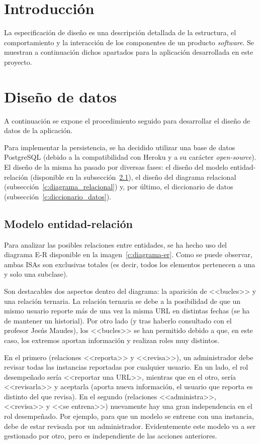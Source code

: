 
\section{Introducción}

La especificación de diseño es una descripción detallada de la estructura, el comportamiento y la interacción de los componentes de un producto \textit{software}. Se muestran a continuación dichos apartados para la aplicación desarrollada en este proyecto.

\section{Diseño de datos}
\label{s:diseno-datos}
A continuación se expone el procedimiento seguido para desarrollar el diseño de datos de la aplicación.

Para implementar la persistencia, se ha decidido utilizar una base de datos PostgreSQL (debido a la compatibilidad con Heroku y a su carácter \textit{open-source}). El diseño de la misma ha pasado por diversas fases: el diseño del modelo entidad-relación (disponible en la subsección~\ref{c:diagrama_entidad_relacion}), el diseño del diagrama relacional (subsección~\ref{c:diagrama_relacional}) y, por último, el diccionario de datos (subsección~\ref{c:diccionario_datos}).


\subsection{Modelo entidad-relación}
\label{c:diagrama_entidad_relacion}

Para analizar las posibles relaciones entre entidades, se ha hecho uso del diagrama E-R disponible en la imagen~\ref{c:diagrama-er}. Como se puede observar, ambas ISAs son exclusivas totales (es decir, todos los elementos pertenecen a una y solo una subclase).

Son destacables dos aspectos dentro del diagrama: la aparición de <<bucles>> y una relación ternaria. La relación ternaria se debe a la posibilidad de que un mismo usuario reporte más de una vez la misma URL en distintas fechas (se ha de mantener un historial). Por otro lado (y tras haberlo consultado con el profesor Jesús Maudes), los <<bucles>> se han permitido debido a que, en este caso, los extremos aportan información y realizan roles muy distintos.

En el primero (relaciones <<reporta>> y <<revisa>>), un administrador debe revisar todas las instancias reportadas por cualquier usuario. En un lado, el rol desempeñado sería <<reportar una URL>>, mientras que en el otro, sería <<revisarla>> y aceptarla (aporta nueva información, el usuario que reporta es distinto del que revisa). En el segundo (relaciones <<administra>>, <<revisa>> y <<se entrena>>) nuevamente hay una gran independencia en el rol desempeñado. Por ejemplo, para que un modelo se entrene con una instancia, debe de estar revisada por un administrador. Evidentemente este modelo va a ser gestionado por otro, pero es independiente de las acciones anteriores.

